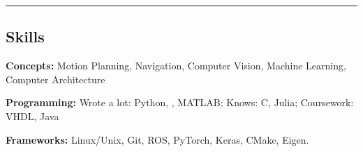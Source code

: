\cvcond{\vspace{-0.5em}}
\hrule
\vspace{-1em}
\subsection*{Skills}
\cvcond{\vspace{-0.5em}}

\begin{indentsection}{\parindent}
    \setlength\itemsep{2em}
    \begin{description*}
        \item \textbf{Concepts:} Motion Planning, Navigation, Computer Vision, Machine Learning, Computer Architecture
        \item \textbf{Programming:} {Wrote a lot}: Python, \CPP, MATLAB; {Knows}: C, Julia; {Coursework}: VHDL, Java
        \item \textbf{Frameworks:} Linux/Unix, Git, ROS, PyTorch, Keras, CMake, Eigen.
    \end{description*}
\end{indentsection}